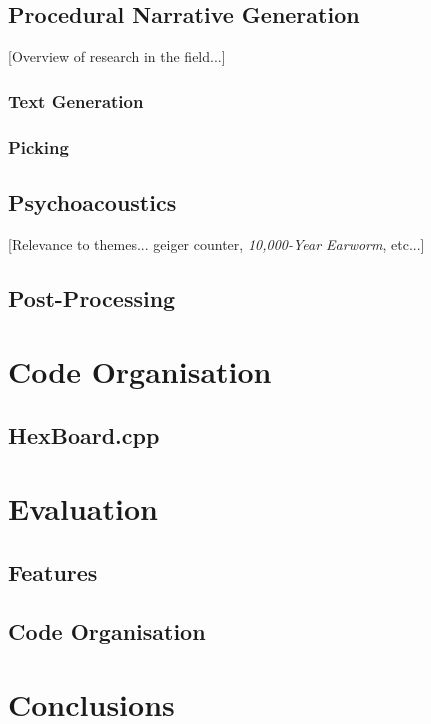 \documentclass[a4paper, 11pt]{article}
\begin{document}
\begin{flushleft}
\subsection{Procedural Narrative Generation}

[Overview of research in the field...]

\subsubsection{Text Generation}

\subsubsection{Picking}

\subsection{Psychoacoustics}

[Relevance to themes... geiger counter, \textit{10,000-Year Earworm}, etc...]

\subsection{Post-Processing}

\section{Code Organisation}

\subsection{HexBoard.cpp}

\section{Evaluation}\label{Evaluation}

\subsection{Features}

\subsection{Code Organisation}

\section{Conclusions}



\end{flushleft}
\end{document}
